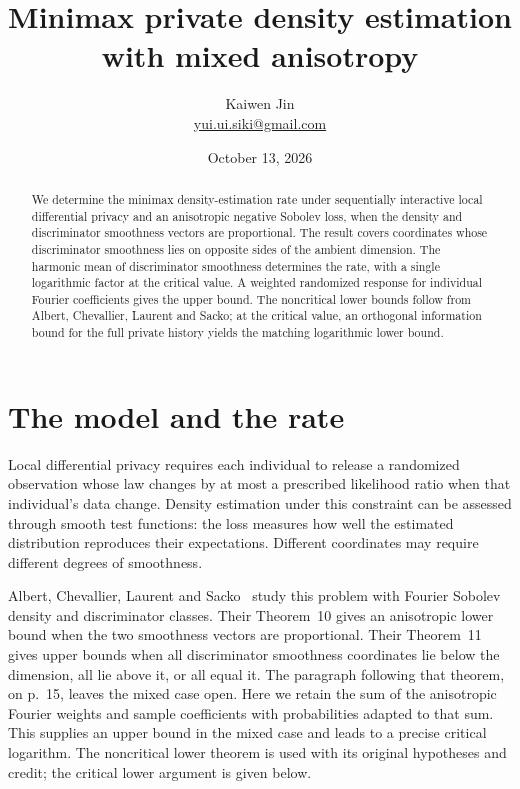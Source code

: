 \documentclass[11pt]{article}
\title{Minimax private density estimation with mixed anisotropy}
\author{Kaiwen Jin\\\small\href{mailto:yui.ui.siki@gmail.com}{yui.ui.siki@gmail.com}}
\date{October 13, 2026}
\begin{document}
\maketitle

\begin{abstract}
We determine the minimax density-estimation rate under sequentially interactive
local differential privacy and an anisotropic negative Sobolev loss, when the
density and discriminator smoothness vectors are proportional. The result
covers coordinates whose discriminator smoothness lies on opposite sides of
the ambient dimension. The harmonic mean of discriminator smoothness determines
the rate, with a single logarithmic factor at the critical value. A weighted
randomized response for individual Fourier coefficients gives the upper bound.
The noncritical lower bounds follow from Albert, Chevallier, Laurent and Sacko;
at the critical value, an orthogonal information bound for the full private
history yields the matching logarithmic lower bound.
\end{abstract}

\section{The model and the rate}

Local differential privacy requires each individual to release a randomized
observation whose law changes by at most a prescribed likelihood ratio when
that individual's data change. Density estimation under this constraint can
be assessed through smooth test functions: the loss measures how well the
estimated distribution reproduces their expectations. Different coordinates
may require different degrees of smoothness.

Albert, Chevallier, Laurent and Sacko~\cite{ACLS} study this problem with Fourier
Sobolev density and discriminator classes. Their Theorem~10 gives an
anisotropic lower bound when the two smoothness vectors are proportional.
Their Theorem~11 gives upper bounds when all discriminator smoothness
coordinates lie below the dimension, all lie above it, or all equal it.
The paragraph following that theorem, on p.~15, leaves the mixed case open.
Here we retain the sum of the anisotropic Fourier weights and sample
coefficients with probabilities adapted to that sum. This supplies an upper
bound in the mixed case and leads to a precise critical logarithm.
The noncritical lower theorem is used with its original hypotheses and credit;
the critical lower argument is given below.
\end{document}
